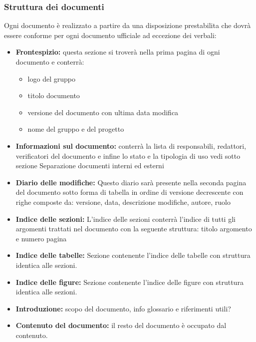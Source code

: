 \documentclass[NormeDiProgetto.tex]{subfiles}
\begin{document}
	\subsubsection{Struttura dei documenti}
		Ogni documento è realizzato a partire da una disposizione prestabilita che dovrà essere conforme per ogni documento ufficiale ad eccezione dei verbali:
		\begin{itemize}
			\item \textbf{Frontespizio:} questa sezione si troverà nella prima pagina di ogni documento e conterrà:
			\begin{itemize}
				\item logo del gruppo
				\item titolo documento
				\item versione del documento con ultima data modifica
				\item nome del gruppo e del progetto
			\end{itemize}
			
			\item \textbf{Informazioni sul documento:} conterrà la lista di responsabili,
			redattori, verificatori del documento e infine lo stato e la tipologia di uso vedi sotto sezione {Separazione documenti interni ed esterni}
			
			\item \textbf{Diario delle modifiche:}
			Questo diario sarà presente nella seconda pagina del documento sotto forma di tabella in ordine di versione decrescente con righe composte da: versione, data, descrizione modifiche, autore, ruolo
			
			\item \textbf{Indice delle sezioni:}
			L'indice delle sezioni conterrà l'indice di tutti gli argomenti trattati nel documento con la seguente struttura: titolo argomento e numero pagina
			
			\item \textbf{Indice delle tabelle:} %
			Sezione contenente l'indice delle tabelle con struttura identica alle sezioni. 
			
			\item \textbf{Indice delle figure:} %
			Sezione contenente l'indice delle figure con struttura identica alle sezioni. 
			
			\item \textbf{Introduzione:}
			scopo del documento, info glossario e riferimenti utili?
			 
			\item \textbf{Contenuto del documento:} il resto del documento è occupato dal contenuto.
			
			
		\end{itemize}
		
\end{document}
